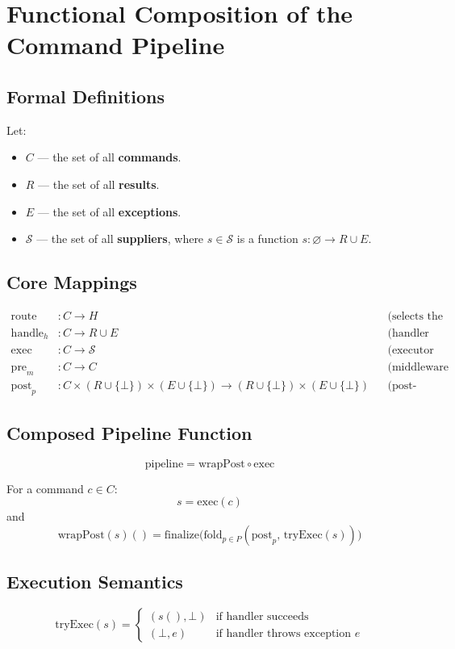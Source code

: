 \section{Functional Composition of the Command Pipeline}

\subsection{Formal Definitions}

Let:
\begin{itemize}
    \item $C$ — the set of all \textbf{commands}.
    \item $R$ — the set of all \textbf{results}.
    \item $E$ — the set of all \textbf{exceptions}.
    \item $\mathcal{S}$ — the set of all \textbf{suppliers}, where $s \in \mathcal{S}$ is a function $s: \varnothing \to R \cup E$.
\end{itemize}

\subsection{Core Mappings}
\[
\begin{aligned}
\text{route} &: C \to H && \text{(selects the appropriate handler)} \\
\text{handle}_h &: C \to R \cup E && \text{(handler processes the command)} \\
\text{exec} &: C \to \mathcal{S} && \text{(executor creates deferred computation)} \\
\text{pre}_m &: C \to C && \text{(middleware transformation)} \\
\text{post}_p &: C \times (R \cup \{\bot\}) \times (E \cup \{\bot\}) \to (R \cup \{\bot\}) \times (E \cup \{\bot\}) && \text{(post-processor)}
\end{aligned}
\]

\subsection{Composed Pipeline Function}
\[
\mathrm{pipeline} = \mathrm{wrapPost} \circ \mathrm{exec}
\]

For a command $c \in C$:
\[
s = \mathrm{exec}(c)
\]
and
\[
\mathrm{wrapPost}(s)() =
\mathrm{finalize}\big(
    \mathrm{fold}_{p \in P}(\mathrm{post}_p,\, \mathrm{tryExec}(s))
\big)
\]

\subsection{Execution Semantics}
\[
\mathrm{tryExec}(s) =
\begin{cases}
    (s(), \bot) & \text{if handler succeeds}\\[4pt]
    (\bot, e) & \text{if handler throws exception } e
\end{cases}
\]

